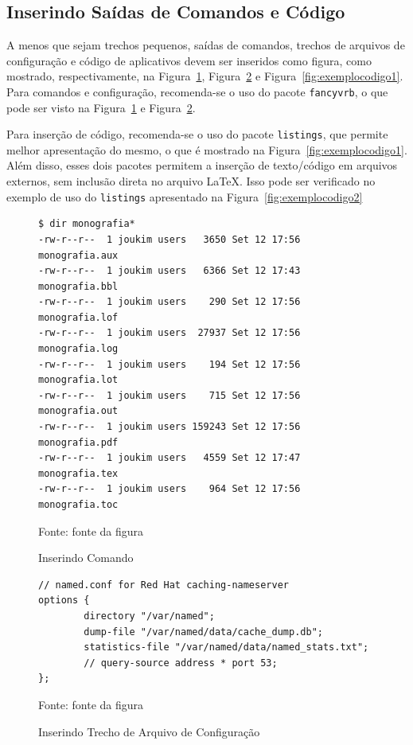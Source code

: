 \subsection{Inserindo Saídas de Comandos e Código}

A menos que sejam trechos pequenos, saídas de comandos, trechos de arquivos de configuração e código de aplicativos devem ser inseridos como figura, como mostrado, respectivamente, na Figura~\ref{fig:exemplocomando}, Figura~\ref{fig:exemploconfig} e Figura~\ref{fig:exemplocodigo1}. Para comandos e configuração, recomenda-se o uso do pacote {\tt fancyvrb}, o que pode ser visto na Figura~\ref{fig:exemplocomando} e Figura~\ref{fig:exemploconfig}.

Para inserção de código, recomenda-se o uso do pacote {\tt listings}, que permite melhor apresentação do mesmo, o que é mostrado na Figura~\ref{fig:exemplocodigo1}. Além disso, esses dois pacotes permitem a inserção de texto/código em arquivos externos, sem inclusão direta no arquivo \LaTeX. Isso pode ser verificado no exemplo de uso do {\tt listings} apresentado na Figura~\ref{fig:exemplocodigo2}

\begin{figure}[!htb]
\centering
\caption{Inserindo Comando} %
\begin{Verbatim}[fontsize=\small]
$ dir monografia*
-rw-r--r--  1 joukim users   3650 Set 12 17:56 monografia.aux
-rw-r--r--  1 joukim users   6366 Set 12 17:43 monografia.bbl
-rw-r--r--  1 joukim users    290 Set 12 17:56 monografia.lof
-rw-r--r--  1 joukim users  27937 Set 12 17:56 monografia.log
-rw-r--r--  1 joukim users    194 Set 12 17:56 monografia.lot
-rw-r--r--  1 joukim users    715 Set 12 17:56 monografia.out
-rw-r--r--  1 joukim users 159243 Set 12 17:56 monografia.pdf
-rw-r--r--  1 joukim users   4559 Set 12 17:47 monografia.tex
-rw-r--r--  1 joukim users    964 Set 12 17:56 monografia.toc
\end{Verbatim} 
{\small Fonte: fonte da figura} %
\label{fig:exemplocomando} %
\end{figure}

\begin{figure}[!htb]
\centering
\caption{Inserindo Trecho de Arquivo de Configuração} %
\begin{Verbatim}[fontsize=\small]
// named.conf for Red Hat caching-nameserver
options {
        directory "/var/named";
        dump-file "/var/named/data/cache_dump.db";
        statistics-file "/var/named/data/named_stats.txt";
        // query-source address * port 53;
};
\end{Verbatim} 
{\small Fonte: fonte da figura} %
\label{fig:exemploconfig} %
\end{figure}


